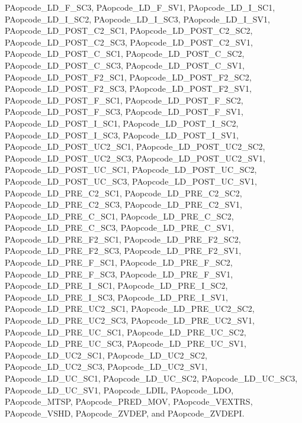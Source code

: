 PAopcode\_\-LD\_\-F\_\-SC3, PAopcode\_\-LD\_\-F\_\-SV1, PAopcode\_\-LD\_\-I\_\-SC1, PAopcode\_\-LD\_\-I\_\-SC2, PAopcode\_\-LD\_\-I\_\-SC3, PAopcode\_\-LD\_\-I\_\-SV1, PAopcode\_\-LD\_\-POST\_\-C2\_\-SC1, PAopcode\_\-LD\_\-POST\_\-C2\_\-SC2, PAopcode\_\-LD\_\-POST\_\-C2\_\-SC3, PAopcode\_\-LD\_\-POST\_\-C2\_\-SV1, PAopcode\_\-LD\_\-POST\_\-C\_\-SC1, PAopcode\_\-LD\_\-POST\_\-C\_\-SC2, PAopcode\_\-LD\_\-POST\_\-C\_\-SC3, PAopcode\_\-LD\_\-POST\_\-C\_\-SV1, PAopcode\_\-LD\_\-POST\_\-F2\_\-SC1, PAopcode\_\-LD\_\-POST\_\-F2\_\-SC2, PAopcode\_\-LD\_\-POST\_\-F2\_\-SC3, PAopcode\_\-LD\_\-POST\_\-F2\_\-SV1, PAopcode\_\-LD\_\-POST\_\-F\_\-SC1, PAopcode\_\-LD\_\-POST\_\-F\_\-SC2, PAopcode\_\-LD\_\-POST\_\-F\_\-SC3, PAopcode\_\-LD\_\-POST\_\-F\_\-SV1, PAopcode\_\-LD\_\-POST\_\-I\_\-SC1, PAopcode\_\-LD\_\-POST\_\-I\_\-SC2, PAopcode\_\-LD\_\-POST\_\-I\_\-SC3, PAopcode\_\-LD\_\-POST\_\-I\_\-SV1, PAopcode\_\-LD\_\-POST\_\-UC2\_\-SC1, PAopcode\_\-LD\_\-POST\_\-UC2\_\-SC2, PAopcode\_\-LD\_\-POST\_\-UC2\_\-SC3, PAopcode\_\-LD\_\-POST\_\-UC2\_\-SV1, PAopcode\_\-LD\_\-POST\_\-UC\_\-SC1, PAopcode\_\-LD\_\-POST\_\-UC\_\-SC2, PAopcode\_\-LD\_\-POST\_\-UC\_\-SC3, PAopcode\_\-LD\_\-POST\_\-UC\_\-SV1, PAopcode\_\-LD\_\-PRE\_\-C2\_\-SC1, PAopcode\_\-LD\_\-PRE\_\-C2\_\-SC2, PAopcode\_\-LD\_\-PRE\_\-C2\_\-SC3, PAopcode\_\-LD\_\-PRE\_\-C2\_\-SV1, PAopcode\_\-LD\_\-PRE\_\-C\_\-SC1, PAopcode\_\-LD\_\-PRE\_\-C\_\-SC2, PAopcode\_\-LD\_\-PRE\_\-C\_\-SC3, PAopcode\_\-LD\_\-PRE\_\-C\_\-SV1, PAopcode\_\-LD\_\-PRE\_\-F2\_\-SC1, PAopcode\_\-LD\_\-PRE\_\-F2\_\-SC2, PAopcode\_\-LD\_\-PRE\_\-F2\_\-SC3, PAopcode\_\-LD\_\-PRE\_\-F2\_\-SV1, PAopcode\_\-LD\_\-PRE\_\-F\_\-SC1, PAopcode\_\-LD\_\-PRE\_\-F\_\-SC2, PAopcode\_\-LD\_\-PRE\_\-F\_\-SC3, PAopcode\_\-LD\_\-PRE\_\-F\_\-SV1, PAopcode\_\-LD\_\-PRE\_\-I\_\-SC1, PAopcode\_\-LD\_\-PRE\_\-I\_\-SC2, PAopcode\_\-LD\_\-PRE\_\-I\_\-SC3, PAopcode\_\-LD\_\-PRE\_\-I\_\-SV1, PAopcode\_\-LD\_\-PRE\_\-UC2\_\-SC1, PAopcode\_\-LD\_\-PRE\_\-UC2\_\-SC2, PAopcode\_\-LD\_\-PRE\_\-UC2\_\-SC3, PAopcode\_\-LD\_\-PRE\_\-UC2\_\-SV1, PAopcode\_\-LD\_\-PRE\_\-UC\_\-SC1, PAopcode\_\-LD\_\-PRE\_\-UC\_\-SC2, PAopcode\_\-LD\_\-PRE\_\-UC\_\-SC3, PAopcode\_\-LD\_\-PRE\_\-UC\_\-SV1, PAopcode\_\-LD\_\-UC2\_\-SC1, PAopcode\_\-LD\_\-UC2\_\-SC2, PAopcode\_\-LD\_\-UC2\_\-SC3, PAopcode\_\-LD\_\-UC2\_\-SV1, PAopcode\_\-LD\_\-UC\_\-SC1, PAopcode\_\-LD\_\-UC\_\-SC2, PAopcode\_\-LD\_\-UC\_\-SC3, PAopcode\_\-LD\_\-UC\_\-SV1, PAopcode\_\-LDIL, PAopcode\_\-LDO, PAopcode\_\-MTSP, PAopcode\_\-PRED\_\-MOV, PAopcode\_\-VEXTRS, PAopcode\_\-VSHD, PAopcode\_\-ZVDEP, and PAopcode\_\-ZVDEPI.

